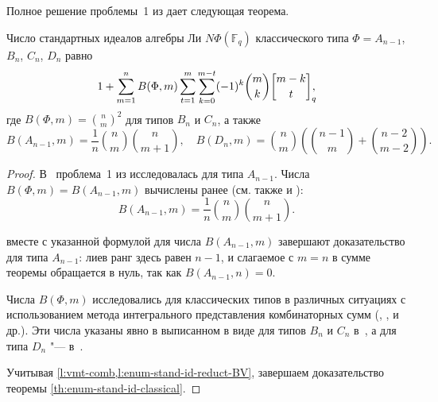 \documentclass[a4paper,14pt,oneside,openany]{memoir}
\begin{document}
Полное решение проблемы~1 из \cite{sigsam2001} дает следующая теорема.
\begin{theorem}\label{th:enum-stand-id-classical}
    Число стандартных идеалов алгебры Ли $N\Phi(\mathbb{F}_q)$ классического типа
    $\Phi = A_{n-1}$, $B_n$, $C_n$, $D_n$ равно
    \begin{equation*}
        1+\sum_{m=1}^n B(\Phi,m) \sum_{t=1}^m
        \sum_{k=0}^{m-t} (-1)^k \binom{m}{k} \qbinom{m-k}{t}[\mathrlap],
    \end{equation*}
    где $B(\Phi,m)=\binom{n}{m}^2$ для типов $B_n$ и $C_n$, а также
    \[
        B(A_{n-1},m) = \frac{1}{n}\binom{n}{m}\binom{n}{m+1}, \quad B(D_n,m) =
        \binom{n}{m}\left( \binom{n-1}{m} + \binom{n-2}{m-2} \right).
    \]
\end{theorem}
\begin{proof}
    В~\cite{vmj2015} проблема~1 из \cite{sigsam2001} исследовалась для типа
    $A_{n-1}$. Числа $B(\Phi,m)=B(A_{n-1},m)$ вычислены ранее
    \cite[теорема~2.1.2]{Egorychev77} (см. также \cite{vL74} и
    \cite{Tolasov-1977}):
    \[
        B(A_{n-1},m) = \frac{1}{n}\binom{n}{m}\binom{n}{m+1}.
    \]

     вместе с указанной
    формулой для числа $B(A_{n-1},m)$ завершают доказательство
     для типа $A_{n-1}$: лиев ранг здесь
    равен $n-1$, и слагаемое с $m = n$ в сумме теоремы обращается в нуль,
    так как $B(A_{n-1},n) = 0$.

    \medskip

    Числа $B(\Phi,m)$ исследовались для классических типов в различных ситуациях с
    использованием метода интегрального представления комбинаторных сумм
    (\cite{Egorychev77}, \cite{Eg-Lev-1996}, \cite{sigsam2001} и др.). Эти числа
    указаны явно в выписанном в  виде для
    типов $B_n$ и $C_n$ в~\cite[предложение~17]{reiner97}, а для типа $D_n$ "---
    в~\cite[теорема~1.2]{reiner04}.

    \medskip

    Учитывая \cref{l:vmt-comb,l:enum-stand-id-reduct-BV}, завершаем доказательство
    теоремы \ref{th:enum-stand-id-classical}.
\end{proof}
\end{document}
